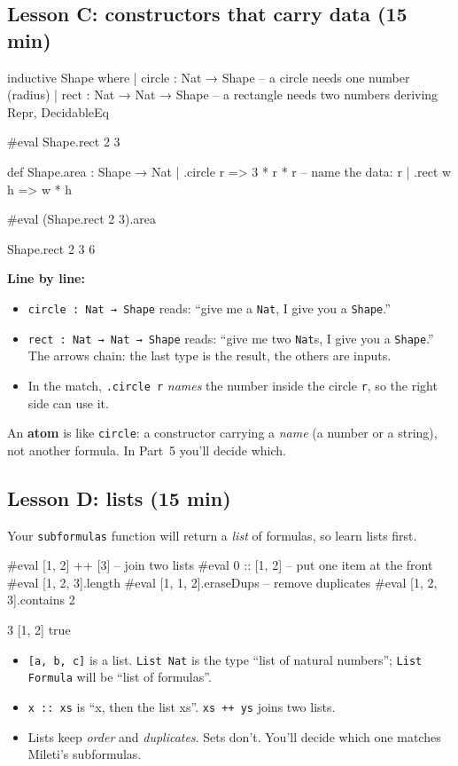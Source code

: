 \documentclass[11pt,a4paper]{article}
\newcommand{\code}[1]{\texttt{#1}}
\begin{document}
\subsection{Lesson C: constructors that carry data (15 min)}
\begin{lean}
inductive Shape where
  | circle : Nat → Shape          -- a circle needs one number (radius)
  | rect   : Nat → Nat → Shape    -- a rectangle needs two numbers
  deriving Repr, DecidableEq

#eval Shape.rect 2 3

def Shape.area : Shape → Nat
  | .circle r => 3 * r * r        -- name the data: r
  | .rect w h => w * h

#eval (Shape.rect 2 3).area
\end{lean}
\begin{output}
Shape.rect 2 3
6
\end{output}
\textbf{Line by line:}
\begin{itemize}
\item \code{circle : Nat → Shape} reads: ``give me a \code{Nat}, I give you a \code{Shape}.''
\item \code{rect : Nat → Nat → Shape} reads: ``give me two \code{Nat}s, I give you a \code{Shape}.'' The arrows chain: the last type is the result, the others are inputs.
\item In the match, \code{.circle r} \emph{names} the number inside the circle \code{r}, so the right side can use it.
\end{itemize}
\begin{tip}
An \textbf{atom} is like \code{circle}: a constructor carrying a \emph{name} (a number or a string), not another formula. In Part~5 you'll decide which.
\end{tip}

\subsection{Lesson D: lists (15 min)}
Your \code{subformulas} function will return a \emph{list} of formulas, so learn lists first.
\begin{lean}
#eval [1, 2] ++ [3]              -- join two lists
#eval 0 :: [1, 2]                -- put one item at the front
#eval [1, 2, 3].length
#eval [1, 1, 2].eraseDups        -- remove duplicates
#eval [1, 2, 3].contains 2
\end{lean}
\begin{output}
[1, 2, 3]
[0, 1, 2]
3
[1, 2]
true
\end{output}
\begin{itemize}
\item \code{[a, b, c]} is a list. \code{List Nat} is the type ``list of natural numbers''; \code{List Formula} will be ``list of formulas''.
\item \code{x :: xs} is ``x, then the list xs''. \code{xs ++ ys} joins two lists.
\item Lists keep \emph{order} and \emph{duplicates}. Sets don't. You'll decide which one matches Mileti's subformulas.
\end{itemize}
\end{document}
